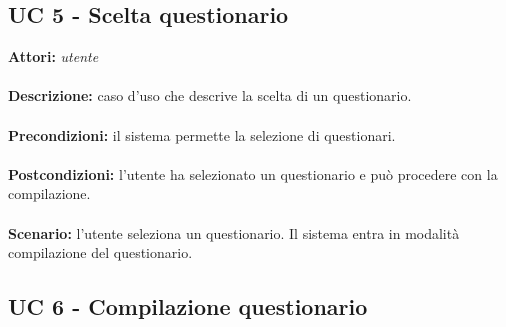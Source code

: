 \documentclass[a4paper,11pt]{article}
\begin{document}
\subsection{UC 5 - Scelta questionario}

\textbf{Attori:} \textit{utente}
\\ \\
\textbf{Descrizione:} caso d'uso che descrive la scelta di un questionario.\\
\\
\textbf{Precondizioni:} il sistema permette la selezione di questionari.\\
\\
\textbf{Postcondizioni:} l’utente ha selezionato un questionario e può procedere con la compilazione.\\
\\
\textbf{Scenario:} l’utente seleziona un questionario. Il sistema entra in modalità compilazione del questionario.\\


\subsection{UC 6 - Compilazione questionario}
\end{document}
